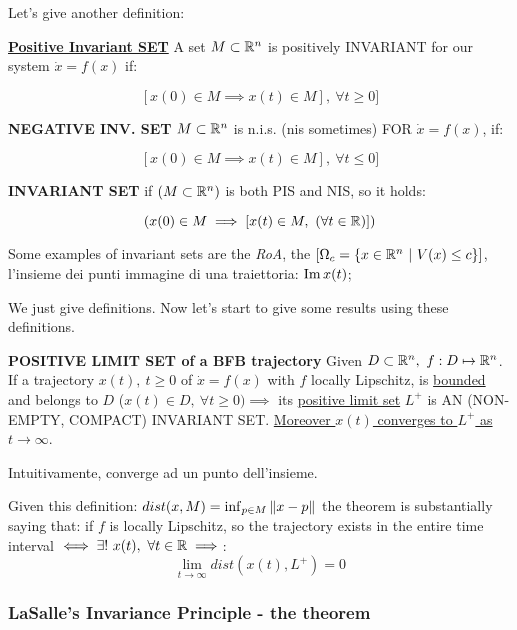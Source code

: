 Let's give another definition:

\begin{defn}{\textbf{\underline{Positive Invariant SET}}}
A set $M \subset \mathbb{R}^n$ is positively INVARIANT for our system $\dot{x}=f(x)$ if:

\[
	[x(0) \in M \implies x(t) \in M],\ \forall t \geq 0]
\]
\end{defn}

\begin{defn}{\textbf{NEGATIVE INV. SET}}
$M \subset \mathbb{R}^n$ is n.i.s. (nis sometimes) FOR $\dot{x}=f(x)$, if:

\[
	 [x(0) \in M \implies x(t) \in M],\ \forall t \leq 0]
\]
\end{defn}

\begin{defn}{\textbf{INVARIANT SET}}
if $(M \subset \mathbb{R}^n)$ is both PIS and NIS, so it holds:

\[
	(x(0) \in M \implies [x(t) \in M,\ (\forall t \in \R)])
\]
\end{defn}

Some examples of invariant sets are the \emph{RoA}, the $[\Omega_c = \{x \in \mathbb{R}^n\ |\ V(x) \leq c\}]$, l'insieme dei punti immagine di una traiettoria: $\operatorname{Im}{x(t)}$;

We just give definitions. Now let's start to give some results using these definitions.

\begin{lemma}{\textbf{POSITIVE LIMIT SET of a BFB trajectory}}
\label{plsbfb}
Given $D \subset \mathbb{R}^n,\ f:D \mapsto \mathbb{R}^n$. If a trajectory $x(t),\ t \geq 0$ of $\dot{x}=f(x)$ with $f$ locally Lipschitz, is \underline{bounded} and belongs to $D$ ($x(t) \in D,\ \forall t \geq 0) \implies$ its \underline{positive limit set} $L^+$ is AN (NON-EMPTY, COMPACT) INVARIANT SET. \underline{Moreover $x(t)$ converges to $L^+$ as $t \to \infty$}.
\end{lemma}

Intuitivamente, converge ad un punto dell'insieme.

Given this definition: $dist(x,M) = \inf_{p\in M}{\lVert x-p\rVert}$ the theorem is substantially saying that: if $f$ is locally Lipschitz, so the trajectory exists in the entire time interval $\iff \exists!\ x(t),\ \forall t \in \mathbb{R} \implies$:
\[
	\lim_{t\to\infty}{dist(x(t),L^+)} = 0
\]

\subsubsection{LaSalle's Invariance Principle - the theorem}

